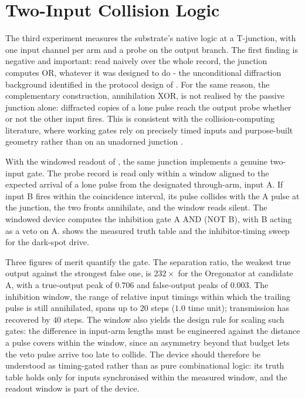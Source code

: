 \section{Two-Input Collision Logic}
\label{sec:res_logic}

The third experiment measures the substrate's native logic at a T-junction, with one input channel per arm and a probe on the output branch.
The first finding is negative and important: read naively over the whole record, the junction computes OR, whatever it was designed to do - the unconditional diffraction background identified in the protocol design of .
For the same reason, the complementary construction, annihilation XOR, is not realised by the passive junction alone: diffracted copies of a lone pulse reach the output probe whether or not the other input fires.
This is consistent with the collision-computing literature, where working gates rely on precisely timed inputs and purpose-built geometry rather than on an unadorned junction \cite{toth1995logic, steinbock1996chemical, adamatzky2002xor}.

With the windowed readout of , the same junction implements a genuine two-input gate.
The probe record is read only within a window aligned to the expected arrival of a lone pulse from the designated through-arm, input A.
If input B fires within the coincidence interval, its pulse collides with the A pulse at the junction, the two fronts annihilate, and the window reads silent.
The windowed device computes the inhibition gate A AND (NOT B), with B acting as a veto on A.
 shows the measured truth table and the inhibitor-timing sweep for the dark-spot drive.

Three figures of merit quantify the gate.
The separation ratio, the weakest true output against the strongest false one, is $232\times$ for the Oregonator at candidate A, with a true-output peak of $0.706$ and false-output peaks of $0.003$.
The inhibition window, the range of relative input timings within which the trailing pulse is still annihilated, spans up to $20$ steps ($1.0$ time unit); transmission has recovered by $40$ steps.
The window also yields the design rule for scaling such gates: the difference in input-arm lengths must be engineered against the distance a pulse covers within the window, since an asymmetry beyond that budget lets the veto pulse arrive too late to collide.
The device should therefore be understood as timing-gated rather than as pure combinational logic: its truth table holds only for inputs synchronised within the measured window, and the readout window is part of the device.

